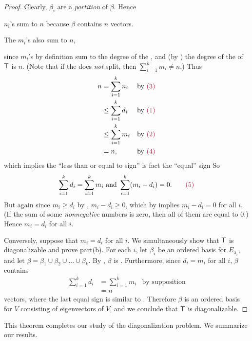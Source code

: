 \begin{proof}
Clearly, \(\beta_i\) are a \emph{partition} of \(\beta\).
Hence
\begin{center}
    \(n_i\)'s sum to \(n\) because \(\beta\) contains \(n\) vectors. \quad \quad {}
\end{center}
\begin{center}
    The \(m_i\)'s also sum to \(n\), \quad \quad {}
\end{center}
since \(m_i\)'s by definition sum to the degree of the  \CPOLY{}, and (by ) the degree of the \CPOLY{} of \(\textsf{T}\) is \(n\).
(Note that if the \CPOLY{} does \emph{not} split, then \(\sum_{i = 1}^k m_i \ne n\).)
Thus
\begin{align*}
    n & = \sum_{i = 1}^k n_i & \text{by \MAROON{(3)}} \\
      & \le \sum_{i = 1}^k d_i & \text{by \MAROON{(1)}} \\
      & \le \sum_{i = 1}^k m_i & \text{by \MAROON{(2)}} \\
      & = n, & \text{by \MAROON{(4)}}
\end{align*}
which implies the ``less than or equal to sign'' is fact the ``equal'' sign
So
\[
    \sum_{i = 1}^k d_i = \sum_{i = 1}^k m_i \text{ and } \sum_{i = 1}^k (m_i - d_i) = 0. \quad \quad \MAROON{(5)}
\]
But again since \(m_i \ge d_i\) by , \(m_i - d_i \ge 0\), which by  implies \(m_i - d_i = 0\) for all \(i\).
(If the sum of some \emph{nonnegative} numbers is zero, then all of them are equal to \(0\).)
Hence \(m_i = d_i\) for all \(i\).

Conversely, suppose that \(m_i = d_i\) for all \(i\).
We simultaneously show that \(\textsf{T}\) is diagonalizable and prove part(b).
For each \(i\), let \(\beta_i\) be an ordered basis for \(E_{\lambda_i}\), and let \(\beta = \beta_1 \cup \beta_2 \cup ... \cup \beta_k\).
By , \(\beta\) is \LID{}.
Furthermore, since \(d_i = m_i\) for all \(i\), \(\beta\) contains
\begin{align*}
    \sum_{i = 1}^k d_i & = \sum_{i = 1}^k m_i & \text{by supposition} \\
        & = n
\end{align*}
vectors, where the last equal sign is similar to .
Therefore \(\beta\) is an ordered basis for \(V\) consisting of eigenvectors of \(V\), and we conclude that \(\textsf{T}\) is diagonalizable.
\end{proof}

This theorem completes our study of the diagonalization problem.
We summarize our results.

